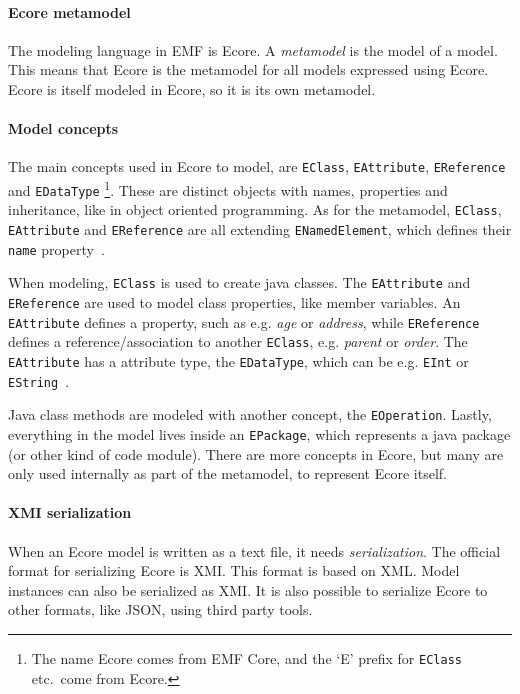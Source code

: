 
\paragraph{\Gls{Ecore} metamodel}
The modeling language in \acrshort{EMF} is \gls{Ecore}.
A \textit{metamodel} is the model of a model.
This means that Ecore is the metamodel for all models expressed using \acrshort{Ecore}.
Ecore is itself modeled in Ecore, so it is its own metamodel.


\paragraph{Model concepts}
The main concepts used in \gls{Ecore} to model, are \texttt{EClass}, \texttt{EAttribute}, \texttt{EReference} and \texttt{EDataType}%
\footnote{The name Ecore comes from EMF Core, and the `E' prefix for \texttt{EClass} etc.\ come from Ecore.}.
These are distinct objects with names, properties and inheritance, like in object oriented programming.
As for the metamodel, \texttt{EClass}, \texttt{EAttribute} and \texttt{EReference} are all extending \texttt{ENamedElement}, which defines their \texttt{name} property~\cite{edmerksEMFEclipseModeling2009}.

When modeling, \texttt{EClass} is used to create java classes.
The \texttt{EAttribute} and \texttt{EReference} are used to model class properties, like member variables.
An \texttt{EAttribute} defines a property, such as e.g. \textit{age} or \textit{address}, while \texttt{EReference} defines a reference/association to another \texttt{EClass}, e.g. \textit{parent} or \textit{order}.
The \texttt{EAttribute} has a attribute type, the \texttt{EDataType}, which can be e.g. \texttt{EInt} or \texttt{EString}~\cite{edmerksEMFEclipseModeling2009}.

Java class methods are modeled with another concept, the \texttt{EOperation}.
Lastly, everything in the model lives inside an \texttt{EPackage}, which represents a java package (or other kind of code module).
There are more concepts in \gls{Ecore}, but many are only used internally as part of the metamodel, to represent \gls{Ecore} itself.


\paragraph{\Acrshort{XMI} serialization}
When an \gls{Ecore} model is written as a text file, it needs \textit{serialization}.
The official format for serializing Ecore is \acrfull{XMI}.
This format is based on \acrfull{XML}.
Model instances can also be serialized as \acrshort{XMI}.
It is also possible to serialize \gls{Ecore} to other formats, like \gls{JSON}, using third party tools.

